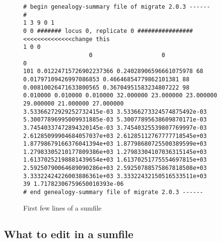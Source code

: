 \begin{figure}[bht]

\begin{center}

\begin{boxedminipage}{16cm}
\begin{small}
\begin{tt}
\begin{verbatim}
# begin genealogy-summary file of migrate 2.0.3 ------
#
1 3 9 0 1
0 0 ####### locus 0, replicate 0 ################    <<<<<<<<<<<<<<change this
1 0 0
                   0                    0                    0
101 0.01224715726902237366 0.24028906596661075978 68
0.01797109426997086853 0.46646854779862101381 88
0.00810026471633800565 0.36704951583234807222 98
0.010000 0.010000 0.010000 32.000000 23.000000 23.000000 29.000000 21.000000 27.000000 
3.53366272929252732415e-03 3.53366273324574875492e-03
5.30077896995009931885e-03 5.30077895638609870171e-03
3.74540337472894320145e-03 3.74540325539807769997e-03
2.61285099904684057037e+03 2.61285112767777718545e+03
1.87798679166376041394e+03 1.87798680725500389599e+03
1.27983305210177809386e+03 1.27983304107036315145e+03
1.61370252198881439654e+03 1.61370251775554697815e+03
2.59250790064689090286e+03 2.59250788575867818508e+03
3.33322424226003886361e+03 3.33322432150516533511e+03
39 1.71782306759650010393e-06
# end genealogy-summary file of migrate 2.0.3 ------
\end{verbatim}
\end{tt}
\end{small}
\end{boxedminipage}
\end{center}
\caption{{\sf First few lines of a sumfile}}
\label{SUMFILE}
\end{figure}
\subsection{What to edit in a sumfile} 

